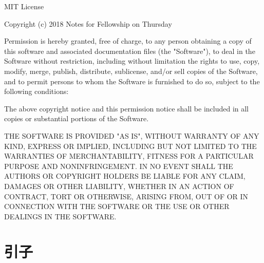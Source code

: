 \documentclass[Chinese]{CKBib}
\begin{document}
\begin{footnotesize}

\clearpage

\noindent MIT License

\vspace{1em}

\noindent Copyright (c) 2018 Notes for Fellowship on Thursday

\vspace{1em}

\noindent Permission is hereby granted, free of charge, to any person obtaining a copy of this software and associated documentation files (the "Software"), to deal in the Software without restriction, including without limitation the rights to use, copy, modify, merge, publish, distribute, sublicense, and/or sell copies of the Software, and to permit persons to whom the Software is furnished to do so, subject to the following conditions:

\noindent The above copyright notice and this permission notice shall be included in all copies or substantial portions of the Software.

\noindent THE SOFTWARE IS PROVIDED "AS IS", WITHOUT WARRANTY OF ANY KIND, EXPRESS OR IMPLIED, INCLUDING BUT NOT LIMITED TO THE WARRANTIES OF MERCHANTABILITY, FITNESS FOR A PARTICULAR PURPOSE AND NONINFRINGEMENT. IN NO EVENT SHALL THE AUTHORS OR COPYRIGHT HOLDERS BE LIABLE FOR ANY CLAIM, DAMAGES OR OTHER LIABILITY, WHETHER IN AN ACTION OF CONTRACT, TORT OR OTHERWISE, ARISING FROM, OUT OF OR IN CONNECTION WITH THE SOFTWARE OR THE USE OR OTHER DEALINGS IN THE SOFTWARE.

\end{footnotesize}

\clearpage
\hbox{}
\vspace*{\fill}
\thispagestyle{empty}
\newpage

\thispagestyle{empty}
\pagestyle{empty}

\renewcommand{\contentsname}{\chapFont 目录}
\tableofcontents*

\clearpage

\thispagestyle{ruled}
\pagestyle{ruled}
\setcounter{page}{1} 

\chapter*{\chapFont 引子}
\end{document}
